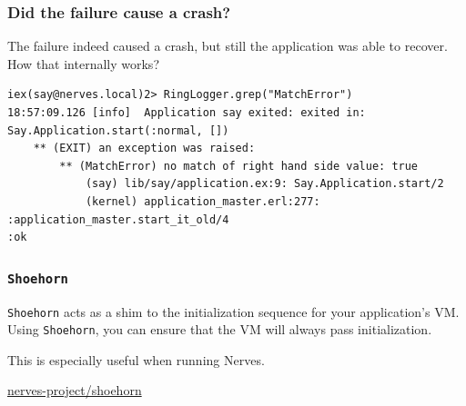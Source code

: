 \documentclass[10pt,xcolor=pdflatex,dvipsnames,table]{beamer}
\begin{document}
\begin{frame}[fragile]
  \frametitle{Did the failure cause a crash?}

  The failure indeed caused a crash, but still the application was able to
  recover. How that internally works?

  \begin{verbatim}
iex(say@nerves.local)2> RingLogger.grep("MatchError")
18:57:09.126 [info]  Application say exited: exited in: Say.Application.start(:normal, [])
    ** (EXIT) an exception was raised:
        ** (MatchError) no match of right hand side value: true
            (say) lib/say/application.ex:9: Say.Application.start/2
            (kernel) application_master.erl:277: :application_master.start_it_old/4
:ok
  \end{verbatim}
\end{frame}

\begin{frame}[standout]
  \frametitle{\texttt{Shoehorn}}

  {\color{white}
  \texttt{Shoehorn} acts as a shim to the initialization sequence for your
  application's VM. Using \texttt{Shoehorn}, you can ensure that the VM will always pass
  initialization.

  This is especially useful when running Nerves.

  \faGithub \hspace{1pt} \href{https://github.com/nerves-project/shoehorn}{nerves-project/shoehorn}
  }

\end{frame}
\end{document}
